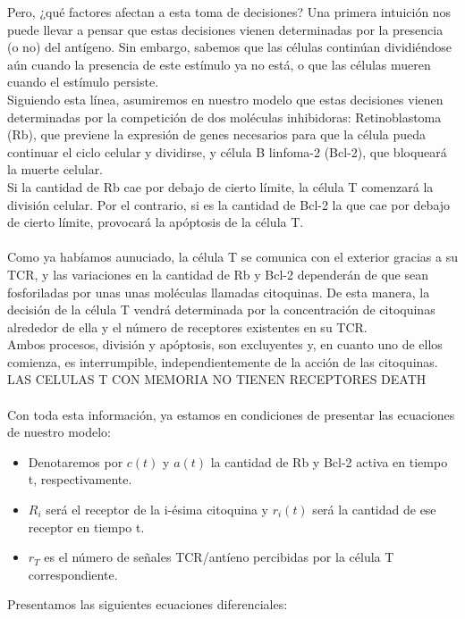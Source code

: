 \documentclass{article}
\begin{document}
	 Pero, ¿qué factores afectan a esta toma de decisiones? Una primera intuición nos puede llevar a pensar que estas decisiones vienen determinadas por la presencia (o no) del antígeno. Sin embargo, sabemos que las células continúan dividiéndose aún cuando la presencia de este estímulo ya no está, o que las células mueren cuando el estímulo persiste. 
	 \\
	 Siguiendo esta línea, asumiremos en nuestro modelo que estas decisiones vienen determinadas por la competición de dos moléculas inhibidoras: Retinoblastoma (Rb), que previene la expresión de genes necesarios para que la célula pueda continuar el ciclo celular y dividirse, y célula B linfoma-2 (Bcl-2), que bloqueará la muerte celular.
	 \\
	 Si la cantidad de Rb cae por debajo de cierto límite, la célula T comenzará la división celular. Por el contrario, si es la cantidad de Bcl-2 la que  cae por debajo de cierto límite, provocará la apóptosis de la célula T. 
	 \\
	 \\
	 Como ya habíamos aunuciado, la célula T se comunica con el exterior gracias a su TCR, y las variaciones en la cantidad de Rb y Bcl-2 dependerán de que sean fosforiladas por unas unas moléculas llamadas citoquinas. De esta manera, la decisión de la célula T vendrá determinada por la concentración de citoquinas alrededor de ella y el número de receptores existentes en su TCR.
	\\
	Ambos procesos, división y apóptosis, son excluyentes y, en cuanto uno de ellos comienza, es interrumpible, independientemente de la acción de las citoquinas. LAS CELULAS T CON MEMORIA NO TIENEN RECEPTORES DEATH
	\\
	\\
	Con toda esta información, ya estamos en condiciones de presentar las ecuaciones de nuestro modelo: 
	\begin{itemize}
	    \item Denotaremos por \textit{$c(t)$} y \textit{$a(t)$} la cantidad de Rb y Bcl-2 activa en tiempo t, respectivamente.
	    \item \textit{$R_{i}$} será el receptor de la i-ésima citoquina y \textit{$r_{i}(t)$} será la cantidad de ese receptor en tiempo t. 
	    \item $r_{T}$ es el número de señales TCR/antíeno  percibidas por la célula T correspondiente.
	\end{itemize} 
	 Presentamos las siguientes ecuaciones diferenciales:
	 
\end{document}
